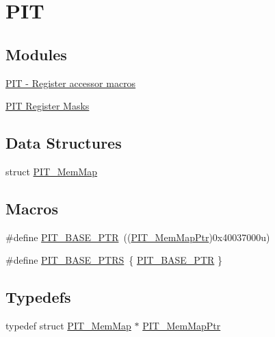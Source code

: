 \hypertarget{group___p_i_t___peripheral}{}\section{P\+I\+T}
\label{group___p_i_t___peripheral}
\subsection*{Modules}
\begin{DoxyCompactItemize}
\item 
\hyperlink{group___p_i_t___register___accessor___macros}{P\+I\+T -\/ Register accessor macros}
\item 
\hyperlink{group___p_i_t___register___masks}{P\+I\+T Register Masks}
\end{DoxyCompactItemize}
\subsection*{Data Structures}
\begin{DoxyCompactItemize}
\item 
struct \hyperlink{struct_p_i_t___mem_map}{P\+I\+T\+\_\+\+Mem\+Map}
\end{DoxyCompactItemize}
\subsection*{Macros}
\begin{DoxyCompactItemize}
\item 
\#define \hyperlink{group___p_i_t___peripheral_ga70be45f58402a8e6d2ce4df7b23aa41c}{P\+I\+T\+\_\+\+B\+A\+S\+E\+\_\+\+P\+T\+R}~((\hyperlink{group___p_i_t___peripheral_ga4efe9d2676c775562cb282254af9a937}{P\+I\+T\+\_\+\+Mem\+Map\+Ptr})0x40037000u)
\item 
\#define \hyperlink{group___p_i_t___peripheral_ga403e0ed71b80cfe3e085fe6b56b5eff0}{P\+I\+T\+\_\+\+B\+A\+S\+E\+\_\+\+P\+T\+R\+S}~\{ \hyperlink{group___p_i_t___peripheral_ga70be45f58402a8e6d2ce4df7b23aa41c}{P\+I\+T\+\_\+\+B\+A\+S\+E\+\_\+\+P\+T\+R} \}
\end{DoxyCompactItemize}
\subsection*{Typedefs}
\begin{DoxyCompactItemize}
\item 
typedef struct \hyperlink{struct_p_i_t___mem_map}{P\+I\+T\+\_\+\+Mem\+Map} $\ast$ \hyperlink{group___p_i_t___peripheral_ga4efe9d2676c775562cb282254af9a937}{P\+I\+T\+\_\+\+Mem\+Map\+Ptr}
\end{DoxyCompactItemize}


